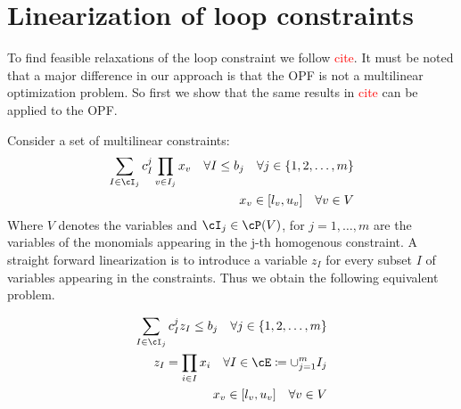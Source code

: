\documentclass{article}
\begin{document}
\section{Linearization of loop constraints}

To find feasible relaxations of the loop constraint we follow \textcolor{red}{cite}. It must be noted that a major difference in our approach is that the OPF is not a multilinear optimization problem. So first we show that the same results in \textcolor{red}{cite} can be applied to the OPF.

Consider a set of multilinear constraints:
\begin{align}
  \sum_{I \in \cI_j}c_I^j\prod_{v \in I_j} x_v \quad \forall I \leq b_j \quad \forall j \in \{1,2,\ldots, m\} \\
  x_v \in [l_v,u_v] \quad \forall v \in V
\end{align}
Where \(V\) denotes the variables and \(\cI_j \in \cP(V)\), for \(j = 1,\ldots,m\) are the variables of the monomials appearing in the j-th homogenous constraint.
A straight forward linearization is to introduce a variable \(z_I\) for every subset \(I\) of variables appearing in the constraints. Thus we obtain the following equivalent problem.

\begin{align}
  \sum_{I \in \cI_j}c_I^jz_I \leq b_j \quad \forall j \in \{1,2,\ldots, m\} \label{constr: linearized multilinear constraint} \\
  z_I = \prod_{i \in I} x_i \quad \forall I \in \cE \coloneqq \cup_{j=1}^m I_j \\
  x_v \in [l_v,u_v] \quad \forall v \in V
\end{align}
\end{document}
